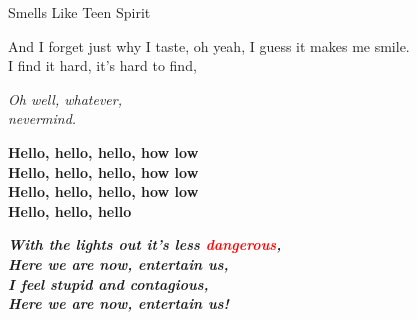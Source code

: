\documentclass[]{article}
\begin{document}
\begin{center}
\phantom{Mumbai}
\vspace{3 em}

{\LARGE Smells Like Teen Spirit}

\end{center}
\vspace{1.5 em} And I forget just why I taste, oh yeah, I guess it makes me smile.
\\I find it hard, it’s hard to find,

{\raggedleft \textit{Oh well, whatever, \\ \hspace{28.7 em} nevermind.}}

\vspace{1.3 em}

\noindent\textbf{Hello, hello, hello, how low
\\ Hello, hello, hello, how low
\\ Hello, hello, hello, how low
\\ Hello, hello, hello
}

\vspace{3 em}
\noindent\textbf{\textit{With the lights out it’s less \textcolor{red}{dangerous},
\\ Here we are now, entertain us,
\\ \textcolor{brown!20!violet!10!red!60!black}{I feel stupid and contagious,}
\\ Here we are now, entertain us!
}}
\end{document}
